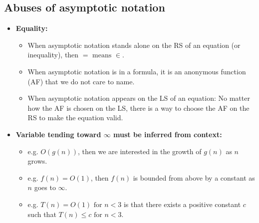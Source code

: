 \subsection{Abuses of asymptotic notation}
    \begin{intuition}
        \begin{itemize}
            \item \textbf{Equality:}
            \begin{itemize}
                \item When asymptotic notation stands alone on the RS of an equation (or inequality), then $= \text{ means } \in$.
                \item When asymptotic notation is in a formula, it is an anonymous function (AF) that we do not care to name.
                \item When asymptotic notation appears on the LS of an equation: No matter how the AF is chosen on the LS, there is a way to choose the AF on the RS to make the equation valid.
            \end{itemize}
            \item \textbf{Variable tending toward $\infty$ must be inferred from context:}
            \begin{itemize}
                \item e.g. $O(g(n))$, then we are interested in the growth of $g(n)$ as $n$ grows.
                \item e.g. $f(n) = O(1)$, then $f(n)$ is bounded from above by a constant as $n$ goes to $\infty$.
                \item e.g. $T(n) = O(1) \text{ for } n<3$ is that there exists a positive constant $c$ such that $T(n) \leq c \text{ for } n<3$.
            \end{itemize}
        \end{itemize}
    \end{intuition}


